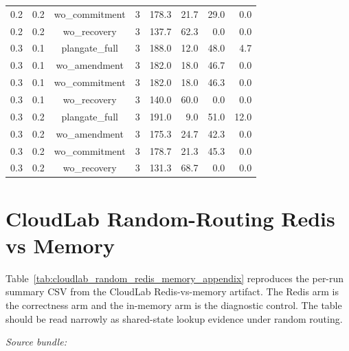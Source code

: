 \documentclass[sigconf,anonymous]{acmart}
\begin{document}
\begin{table}[h]
{\begin{tabular}{@{}cccrrrrr@{}}
0.2 & 0.2 & wo\_commitment & 3 & 178.3 & 21.7 & 29.0 & 0.0 \\
0.2 & 0.2 & wo\_recovery & 3 & 137.7 & 62.3 & 0.0 & 0.0 \\
0.3 & 0.1 & plangate\_full & 3 & 188.0 & 12.0 & 48.0 & 4.7 \\
0.3 & 0.1 & wo\_amendment & 3 & 182.0 & 18.0 & 46.7 & 0.0 \\
0.3 & 0.1 & wo\_commitment & 3 & 182.0 & 18.0 & 46.3 & 0.0 \\
0.3 & 0.1 & wo\_recovery & 3 & 140.0 & 60.0 & 0.0 & 0.0 \\
0.3 & 0.2 & plangate\_full & 3 & 191.0 & 9.0 & 51.0 & 12.0 \\
0.3 & 0.2 & wo\_amendment & 3 & 175.3 & 24.7 & 42.3 & 0.0 \\
0.3 & 0.2 & wo\_commitment & 3 & 178.7 & 21.3 & 45.3 & 0.0 \\
0.3 & 0.2 & wo\_recovery & 3 & 131.3 & 68.7 & 0.0 & 0.0 \\
\bottomrule
\end{tabular}}
\end{table}

\section{CloudLab Random-Routing Redis vs Memory}
\label{sec:cloudlab_random_redis_memory_appendix}

Table~\ref{tab:cloudlab_random_redis_memory_appendix} reproduces the per-run summary CSV from the CloudLab Redis-vs-memory artifact. The Redis arm is the correctness arm and the in-memory arm is the diagnostic control. The table should be read narrowly as shared-state lookup evidence under random routing.

\noindent\textit{Source bundle:} 

\begin{table}[h]
\centering
\caption{Complete CloudLab Redis-vs-memory per-run summary.}
\label{tab:cloudlab_random_redis_memory_appendix}
\small
{}
\end{table}
\end{document}
